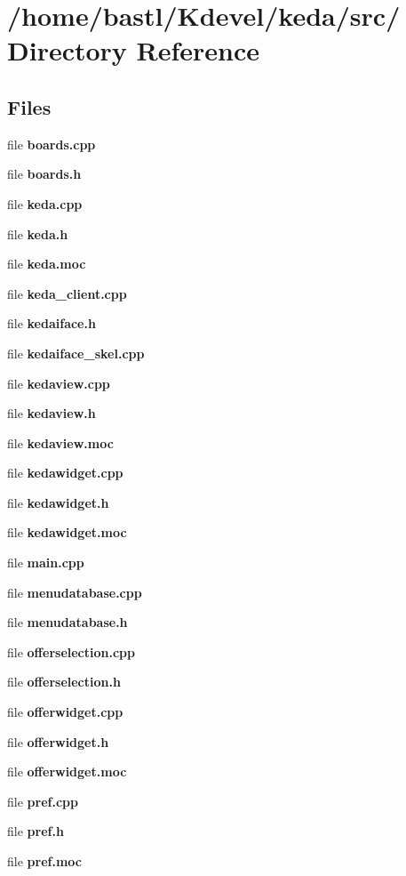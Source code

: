 \section{/home/bastl/Kdevel/keda/src/ Directory Reference}
\label{dir__2Fhome_2Fbastl_2FKdevel_2Fkeda_2Fsrc_2F}
\subsection*{Files}
\begin{CompactItemize}
\item 
file {\bf boards.cpp}
\item 
file {\bf boards.h}
\item 
file {\bf keda.cpp}
\item 
file {\bf keda.h}
\item 
file {\bf keda.moc}
\item 
file {\bf keda\_\-client.cpp}
\item 
file {\bf kedaiface.h}
\item 
file {\bf kedaiface\_\-skel.cpp}
\item 
file {\bf kedaview.cpp}
\item 
file {\bf kedaview.h}
\item 
file {\bf kedaview.moc}
\item 
file {\bf kedawidget.cpp}
\item 
file {\bf kedawidget.h}
\item 
file {\bf kedawidget.moc}
\item 
file {\bf main.cpp}
\item 
file {\bf menudatabase.cpp}
\item 
file {\bf menudatabase.h}
\item 
file {\bf offerselection.cpp}
\item 
file {\bf offerselection.h}
\item 
file {\bf offerwidget.cpp}
\item 
file {\bf offerwidget.h}
\item 
file {\bf offerwidget.moc}
\item 
file {\bf pref.cpp}
\item 
file {\bf pref.h}
\item 
file {\bf pref.moc}
\end{CompactItemize}
